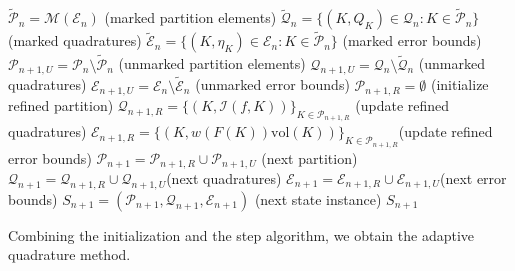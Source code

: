\documentclass[a4paper, 11pt]{article}
\newcommand{\vol}{\mathrm{vol}}
\begin{document}
	\vspace{1em}
	\begin{algorithm}[H]
		\LinesNotNumbered
		\DontPrintSemicolon
		\caption{$\mathrm{Step}_A(S_n, P)$}
		\label{alg: step}
		
		\BlankLine
		$\widetilde{\mathcal{P}}_n = \mathcal{M}(\mathcal{E}_n)$ \quad (marked partition elements)\;
		$\widetilde{\mathcal{Q}}_n = \{(K,Q_K)\in\mathcal{Q}_n : K\in\widetilde{\mathcal{P}}_n\}$ \quad (marked quadratures)\;
		$\widetilde{\mathcal{E}}_n = \{(K,\eta_K)\in\mathcal{E}_n : K\in\widetilde{\mathcal{P}}_n\}$ \quad (marked error bounds)\;
		$\mathcal{P}_{n+1, U} = \mathcal{P}_n \setminus \widetilde{\mathcal{P}}_n$ \quad (unmarked partition elements)\;
		$\mathcal{Q}_{n+1, U} = \mathcal{Q}_n \setminus \widetilde{\mathcal{Q}}_n$ \quad (unmarked quadratures)\;
		$\mathcal{E}_{n+1, U} = \mathcal{E}_n \setminus \widetilde{\mathcal{E}}_n$ \quad (unmarked error bounds)\;
		$\mathcal{P}_{n+1, R} = \emptyset$ \quad (initialize refined partition)\;
		$\mathcal{Q}_{n+1, R} = \{(K, \mathcal{I}(f,K))\}_{K \in \mathcal{P}_{n+1,R}}$ \quad (update refined quadratures)\;
		$\mathcal{E}_{n+1, R} = \{(K, w(F(K))\vol(K))\}_{K \in \mathcal{P}_{n+1,R}}$\quad (update refined error bounds)\;
		$\mathcal{P}_{n+1} = \mathcal{P}_{n+1, R} \cup \mathcal{P}_{n+1, U}$ \quad (next partition)\;
		$\mathcal{Q}_{n+1} = \mathcal{Q}_{n+1, R} \cup \mathcal{Q}_{n+1, U}$\quad (next quadratures)\;
		$\mathcal{E}_{n+1} = \mathcal{E}_{n+1, R} \cup \mathcal{E}_{n+1, U}$\quad (next error bounds)\;
		$S_{n+1} = (\mathcal{P}_{n+1}, \mathcal{Q}_{n+1}, \mathcal{E}_{n+1})$ \quad (next state instance)\;
		\Return $S_{n+1}$\;
	\end{algorithm}
	\vspace{1em}
	
	Combining the initialization and the step algorithm, we obtain the adaptive quadrature method.
	
\end{document}
